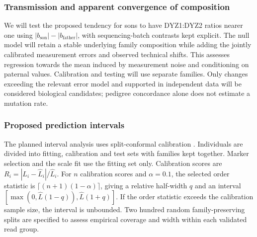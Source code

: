 \subsubsection{Transmission and apparent convergence of composition}
We will test the proposed tendency for sons to have DYZ1:DYZ2 ratios nearer one using $|b_{\mathrm{son}}|-|b_{\mathrm{father}}|$, with sequencing-batch contrasts kept explicit. The null model will retain a stable underlying family composition while adding the jointly calibrated measurement errors and observed technical shifts. This assesses regression towards the mean induced by measurement noise and conditioning on paternal values. Calibration and testing will use separate families. Only changes exceeding the relevant error model and supported in independent data will be considered biological candidates; pedigree concordance alone does not estimate a mutation rate.

\subsubsection{Proposed prediction intervals}
The planned interval analysis uses split-conformal calibration \cite{Lei2018}. Individuals are divided into fitting, calibration and test sets with families kept together. Marker selection and the scale fit use the fitting set only. Calibration scores are $R_i=|L_i-\widehat L_i|/\widehat L_i$. For $n$ calibration scores and $\alpha=0.1$, the selected order statistic is $\lceil(n+1)(1-\alpha)\rceil$, giving a relative half-width $q$ and an interval $[\max(0,\widehat L(1-q)),\widehat L(1+q)]$. If the order statistic exceeds the calibration sample size, the interval is unbounded. Two hundred random family-preserving splits are specified to assess empirical coverage and width within each validated read group.


